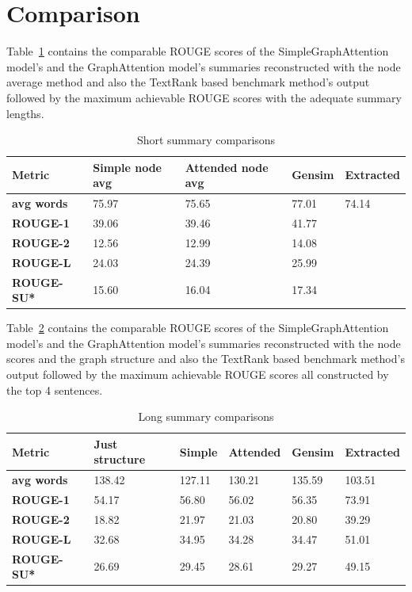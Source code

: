 \section{Comparison}

Table~\ref{tab:short} contains the comparable ROUGE scores of the SimpleGraphAttention model's and the GraphAttention model's summaries reconstructed with the node average method and also the TextRank based benchmark method's output followed by the maximum achievable ROUGE scores with the adequate summary lengths.

\begin{table}[!ht]
	\centering
	\begin{tabular}{| l | l | l | l | l |}
		\hline
		\textbf{Metric}&\textbf{Simple node avg}&\textbf{Attended node avg}&\textbf{Gensim}&\textbf{Extracted} \\ \hline \hline
		\textbf{avg words}&75.97&75.65&77.01&74.14 \\ \hline
		\textbf{ROUGE-1}&39.06&39.46&41.77& \\ \hline
		\textbf{ROUGE-2}&12.56&12.99&14.08& \\ \hline
		\textbf{ROUGE-L}&24.03&24.39&25.99& \\ \hline
		\textbf{ROUGE-SU*}&15.60&16.04&17.34& \\ \hline
	\end{tabular}
	\caption{Short summary comparisons}
	\label{tab:short}
\end{table}

Table~\ref{tab:long} contains the comparable ROUGE scores of the SimpleGraphAttention model's and the GraphAttention model's summaries reconstructed with the node scores and the graph structure and also the TextRank based benchmark method's output followed by the maximum achievable ROUGE scores all constructed by the top 4 sentences.

\begin{table}[!ht]
	\centering
	\begin{tabular}{| l | l | l | l | l | l |}
		\hline
		\textbf{Metric}&\textbf{Just structure}&\textbf{Simple}&\textbf{Attended}&\textbf{Gensim}&\textbf{Extracted} \\ \hline \hline
		\textbf{avg words}&138.42&127.11&130.21&135.59&103.51 \\ \hline
		\textbf{ROUGE-1}&54.17&56.80&56.02&56.35&73.91 \\ \hline
		\textbf{ROUGE-2}&18.82&21.97&21.03&20.80&39.29 \\ \hline
		\textbf{ROUGE-L}&32.68&34.95&34.28&34.47&51.01 \\ \hline
		\textbf{ROUGE-SU*}&26.69&29.45&28.61&29.27&49.15 \\ \hline
	\end{tabular}
	\caption{Long summary comparisons}
	\label{tab:long}
\end{table}
